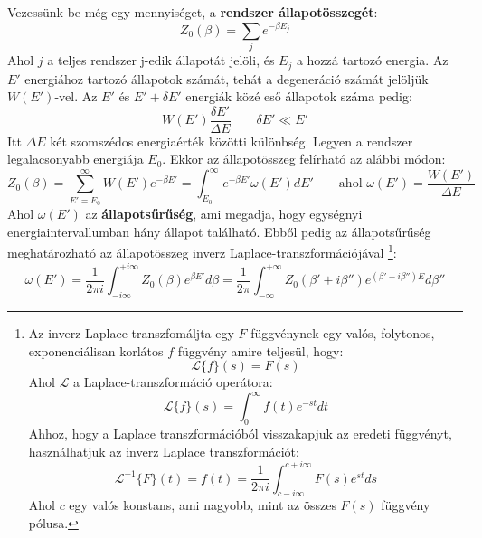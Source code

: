 \documentclass[../main.tex]{subfiles}
\begin{document}
Vezessünk be még egy mennyiséget, a \textbf{rendszer állapotösszegét}:
\begin{equation}
    Z_0(\beta) = \sum_{j} e^{- \beta E_j}
\end{equation}
Ahol $j$ a teljes rendszer j-edik állapotát jelöli, és $E_j$ a hozzá tartozó energia. Az $E'$ energiához tartozó állapotok számát, tehát a degeneráció számát jelöljük $W(E')$-vel.
Az $E'$ és $E' + \delta E'$ energiák közé eső állapotok száma pedig:
\begin{equation}
    W(E') \frac{\delta E'}{\Delta E} \qquad \delta E' \ll E' 
\end{equation}
Itt $\Delta E$ két szomszédos energiaérték közötti különbség. Legyen a rendszer legalacsonyabb energiája $E_0$. Ekkor az állapotösszeg felírható az alábbi módon:
\begin{equation}
    Z_0(\beta) = \sum_{E' = E_0}^\infty W(E') e^{- \beta E'} = \int_{E_0}^\infty e^{- \beta E'} \omega(E') dE' \qquad \text{ahol } \omega(E') = \frac{W(E')}{\Delta E}
\end{equation}
Ahol $\omega(E')$ az \textbf{állapotsűrűség}, ami megadja, hogy egységnyi energiaintervallumban hány állapot található. Ebből pedig az állapotsűrűség meghatározható az állapotösszeg inverz Laplace-transzformációjával
\footnote{
    Az inverz Laplace transzfomáljta egy $F$ függvénynek egy valós, folytonos, exponenciálisan korlátos $f$ függvény amire teljesül, hogy:
    \begin{equation*}
        \mathcal{L} \{f\}(s) = F(s)
    \end{equation*}
    Ahol $\mathcal{L}$ a Laplace-transzformáció operátora:
    \begin{equation*}
        \mathcal{L}\{f\}(s) = \int_0^\infty f(t) e^{-st} dt
    \end{equation*}
    Ahhoz, hogy a Laplace transzformációból visszakapjuk az eredeti függvényt, használhatjuk az inverz Laplace transzformációt:
    \begin{equation*}
        \mathcal{L}^{-1}\{F\}(t) = f(t) = \frac{1}{2 \pi i} \int_{c - i \infty}^{c + i \infty} F(s) e^{st} ds
    \end{equation*}
    Ahol $c$ egy valós konstans, ami nagyobb, mint az összes $F(s)$ függvény pólusa.
}:
\begin{equation}
    \omega(E') = \frac{1}{2 \pi i} \int_{- i \infty}^{+ i \infty} Z_0(\beta) e^{\beta E'} d\beta = \frac{1}{2 \pi} \int_{-\infty}^{+ \infty} Z_0 (\beta' + i \beta'')e^{(\beta' + i \beta'') E} d\beta''
\end{equation}
\end{document}
